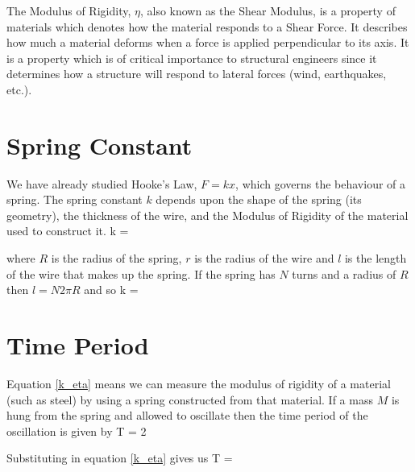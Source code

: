The Modulus of Rigidity, $\eta$, also known as the Shear Modulus, is a property of materials which denotes how the material responds to a Shear Force. It describes how much a material deforms when a force is applied perpendicular to its axis. It is a property which is of critical importance to structural engineers since it determines how a structure will respond to lateral forces (wind, earthquakes, etc.).


\section{Spring Constant}

We have already studied Hooke's Law, $F = k x$, which governs the behaviour of a spring. The spring constant $k$ depends upon the shape of the spring (its geometry), the thickness of the wire, and the Modulus of Rigidity of the material used to construct it.
%
\beq
    k = 
\eeq

where $R$ is the radius of the spring, $r$ is the radius of the wire and $l$ is the length of the wire that makes up the spring. If the spring has $N$ turns and a radius of $R$ then $l = N 2 \pi R$ and so
%
\beq \label{k_eta}
    k = 
\eeq


\section{Time Period}

Equation \eqref{k_eta} means we can measure the modulus of rigidity of a material (such as steel) by using a spring constructed from that material. If a mass $M$ is hung from the spring and allowed to oscillate then the time period of the oscillation is given by
%
\beq
    T = 2 \pi {}
\eeq

Substituting in equation \eqref{k_eta} gives us
%
\beq
    T =  
\eeq
